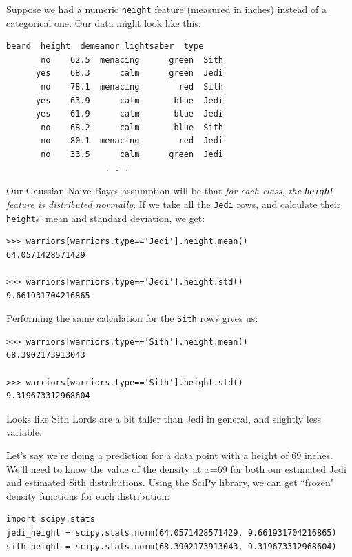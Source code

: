 \documentclass[12pt]{article}
\begin{document}
Suppose we had a numeric \texttt{height} feature (measured in inches) instead
of a categorical one. Our data might look like this:

\begin{Verbatim}[fontsize=\small,samepage=true,frame=none]
    beard  height  demeanor lightsaber  type
       no    62.5  menacing      green  Sith
      yes    68.3      calm      green  Jedi
       no    78.1  menacing        red  Sith
      yes    63.9      calm       blue  Jedi
      yes    61.9      calm       blue  Jedi
       no    68.2      calm       blue  Sith
       no    80.1  menacing        red  Jedi
       no    33.5      calm      green  Jedi
                    . . .
\end{Verbatim}

Our Gaussian Naive Bayes assumption will be that \textit{for each class, the
\texttt{height} feature is distributed normally}. If we take all the
\texttt{Jedi} rows, and calculate their \texttt{height}s' mean and standard
deviation, we get:

\begin{Verbatim}[fontsize=\small,samepage=true,frame=none]
>>> warriors[warriors.type=='Jedi'].height.mean()
64.0571428571429

>>> warriors[warriors.type=='Jedi'].height.std()
9.661931704216865
\end{Verbatim}

Performing the same calculation for the \texttt{Sith} rows gives us:

\begin{Verbatim}[fontsize=\small,samepage=true,frame=none]
>>> warriors[warriors.type=='Sith'].height.mean()
68.3902173913043

>>> warriors[warriors.type=='Sith'].height.std()
9.319673312968604
\end{Verbatim}

Looks like Sith Lords are a bit taller than Jedi in general, and slightly less
variable.

\vspace{.1in}
Let's say we're doing a prediction for a data point with a height of 69
inches. We'll need to know the value of the density at $x$=69 for both our
estimated Jedi and estimated Sith distributions. Using the SciPy library, we
can get ``frozen" density functions for each distribution:

\begin{Verbatim}[fontsize=\small,samepage=true,frame=none]
import scipy.stats
jedi_height = scipy.stats.norm(64.0571428571429, 9.661931704216865)
sith_height = scipy.stats.norm(68.3902173913043, 9.319673312968604)
\end{Verbatim}
\end{document}
